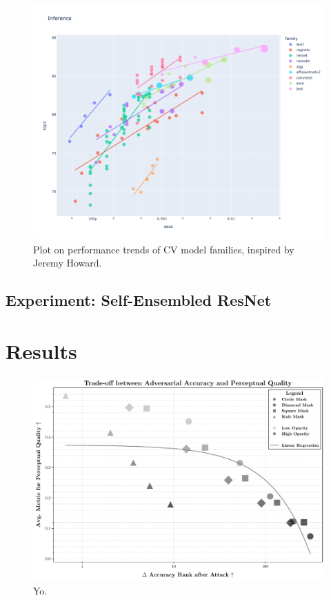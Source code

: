 \documentclass[a4paper, oneside]{discothesis}
\begin{document}

\begin{figure}
	\centering
	\includegraphics[width=0.3\columnwidth]{figures/eval-families.png}
	\caption{Plot on performance trends of CV model families, inspired by Jeremy Howard.}
	\label{fig:families}
\end{figure}








\section{Experiment: Self-Ensembled ResNet}








\chapter{Results}

\begin{figure}
	\centering
	\includegraphics[width=1\columnwidth]{figures/eval_cls_generalizability.pdf}
	\caption{Yo.}
	\label{fig:yo}
\end{figure}
\end{document}
